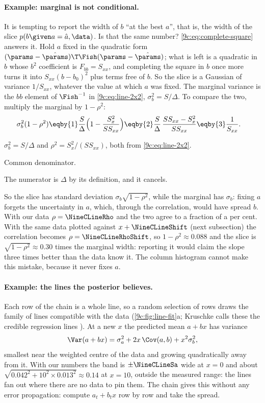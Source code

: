\paragraph{Example: marginal is not conditional.} It is tempting to report the width of $b$ ``at
the best $a$'', that is, the width of the slice $p(b\given a=\hat a,\data)$. Is that the same number?
\eqref{9c:eq:complete-square} answers it. Hold $a$ fixed in the quadratic form
$(\params-\hat\params)\T\Fish(\params-\hat\params)$; what is left is a quadratic in $b$ whose $b^2$
coefficient is $F_{bb}=S_{xx}$, and completing the square in $b$ once more turns it into
$S_{xx}(b-b_0)^2$ plus terms free of $b$. So the slice is a Gaussian of variance $1/S_{xx}$, whatever
the value at which $a$ was fixed. The marginal variance is the $bb$ element of $\Fish^{-1}$ in
\eqref{9c:eq:line-2x2}, $\sigma_b^2=S/\Delta$. To compare the two, multiply the marginal by $1-\rho^2$:
\begin{align}
  \sigma_b^2(1-\rho^2)
  &\eqby{1}\frac{S}{\Delta}\Bigl(1-\frac{S_x^2}{SS_{xx}}\Bigr)
   \eqby{2}\frac{S}{\Delta}\,\frac{SS_{xx}-S_x^2}{SS_{xx}}
   \eqby{3}\frac{1}{S_{xx}} .
  \label{9c:eq:slice}
\end{align}
\begin{explain}
  \item $\sigma_b^2=S/\Delta$ and $\rho^2=S_x^2/(SS_{xx})$, both from \eqref{9c:eq:line-2x2}.
  \item Common denominator.
  \item The numerator is $\Delta$ by its definition, and it cancels.
\end{explain}
So the slice has standard deviation $\sigma_b\sqrt{1-\rho^2}$, while the marginal has $\sigma_b$: fixing
$a$ forgets the uncertainty in $a$, which, through the correlation, would have spread $b$. With our data $\rho=\NineCLineRho$ and the two agree to a fraction of a per cent. With
the same data plotted against $x+\NineCLineShift$ (next subsection) the correlation becomes
$\rho=\NineCLineRhoShift$, so $1-\rho^2\approx0.088$ and the slice is $\sqrt{1-\rho^2}\approx0.30$ times
the marginal width:
reporting it would claim the slope three times better than the data know it. The column histogram
cannot make this mistake, because it never fixes $a$.

\paragraph{Example: the lines the posterior believes.} Each row of the chain is a whole line, so a
random selection of rows draws the family of lines compatible with the data
(\cref{9c:fig:line-fit}a; Kruschke calls these the credible regression lines
). At a new $x$ the predicted mean $a+bx$ has variance
\[
  \Var(a+bx)=\sigma_a^2+2x\,\Cov(a,b)+x^2\sigma_b^2 ,
\]
smallest near the weighted centre of the data and growing quadratically away from it. With our
numbers the band is $\pm\NineCLineSa$ wide at $x=0$ and about
$\sqrt{0.042^2+10^2\times0.013^2}\approx0.14$ at $x=10$, outside the measured range: the lines fan
out where there are no data to pin them. The chain gives this without any error propagation:
compute $a_t+b_tx$ row by row and take the spread.

